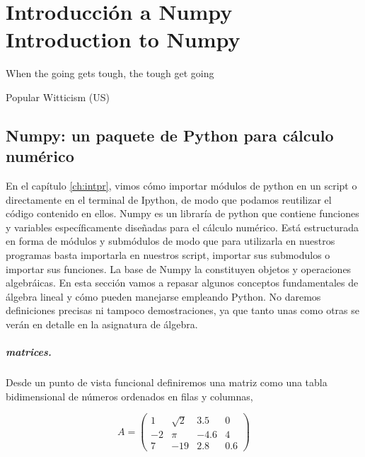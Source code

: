 \chapter{Introducción a Numpy\\ Introduction to Numpy} 
\epigraph{When the going gets tough, the tough get going}{Popular Witticism (US)}
\begin{paracol}{2}
\section{Numpy: un paquete de Python para cálculo nu\-mérico}
En el capítulo \ref{ch:intpr}, vimos cómo importar mó\-dulos de python en un script o directamente en el terminal de Ipython, de modo que podamos reutilizar el código contenido en ellos. Numpy es un libraría de python que contiene funciones y variables específicamente diseñadas para el cálculo numérico. Está estructurada en forma de módulos y submódulos de modo que para utilizarla en nuestros programas basta  importarla en nuestros script, importar sus submodulos o importar sus funciones.
La base de Numpy la constituyen objetos y operaciones algebráicas. En esta sección vamos a repasar algunos conceptos fundamentales de  álgebra lineal y cómo pueden manejarse empleando Python. No daremos definiciones precisas ni tampoco demostraciones, ya que tanto unas como otras se verán en detalle en la asignatura de álgebra.

\paragraph{matrices.} Desde un punto de vista funcional definiremos una matriz como una tabla bidimensional de números ordenados en filas y columnas,

\end{paracol}

\begin{equation*}
A=
\begin{pmatrix}
1& \sqrt{2}& 3.5& 0\\
-2& \pi& -4.6& 4\\
7& -19& 2.8& 0.6
\end{pmatrix}
\end{equation*}

